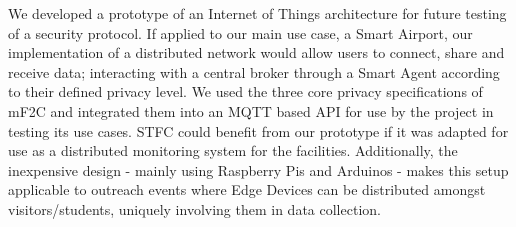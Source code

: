 We developed a prototype of an Internet of Things architecture for future testing of a security protocol. If applied to our main use case, a Smart Airport, our implementation of a distributed network would allow users to connect, share and receive data; interacting with a central broker through a Smart Agent according to their defined privacy level. We used the three core privacy specifications of mF2C and integrated them into an MQTT based API for use by the project in testing its use cases. STFC could benefit from our prototype if it was adapted for use as a distributed monitoring system for the facilities. Additionally, the inexpensive design - mainly using Raspberry Pis and Arduinos - makes this setup applicable to outreach events where Edge Devices can be distributed amongst visitors/students, uniquely involving them in data collection.
